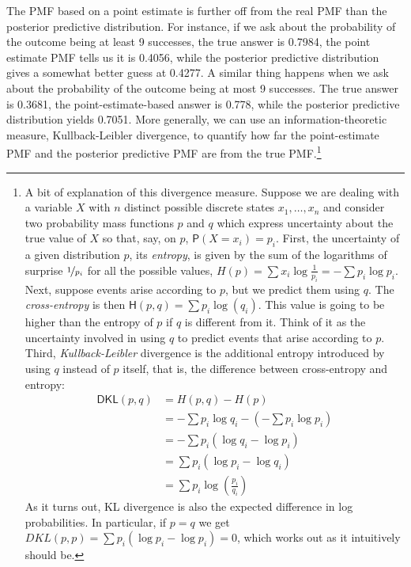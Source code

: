 \documentclass[
  10pt,
  dvipsnames,enabledeprecatedfontcommands]{scrartcl}
\newcommand{\pr}[1]{\mathsf{P}(#1)}
\begin{document}
The PMF based on a point estimate is further off from the real PMF than
the posterior predictive distribution. For instance, if we ask about the
probability of the outcome being at least 9 successes, the true answer
is 0.7984, the point estimate PMF tells us it is 0.4056, while the
posterior predictive distribution gives a somewhat better guess at
0.4277. A similar thing happens when we ask about the probability of the
outcome being at most 9 successes. The true answer is 0.3681, the
point-estimate-based answer is 0.778, while the posterior predictive
distribution yields 0.7051. More generally, we can use an
information-theoretic measure, Kullback-Leibler divergence, to quantify
how far the point-estimate PMF and the posterior predictive PMF are from
the true
PMF.\footnote{A bit of explanation of this divergence measure. Suppose we are dealing with a variable $X$ with $n$ distinct possible discrete states $x_1, \dots, x_n$ and consider two probability mass functions $p$ and $q$ which express uncertainty about the true value of $X$ so that, say, on $p$, $\pr{X=x_i}=p_i$. First, the uncertainty of a given distribution $p$, its \emph{entropy}, is given by the sum of the logarithms of surprise $\nicefrac{1}{p_i}$ for all the possible values,  $H(p) = \sum x_i \log \frac{1}{p_i} = - \sum p_i \log p_i$.  Next, suppose events arise according to $p$, but we predict them
using $q$. The \emph{cross-entropy}  is then  $\mathsf{H}(p, q)  = \sum p_i \log(q_i)$. This value is going to be higher than the entropy of $p$ if $q$ is different from it. Think of it as the uncertainty involved in using $q$ to predict events that arise according to $p$.  Third, \emph{Kullback-Leibler}  divergence is the additional entropy introduced by
using $q$ instead of $p$ itself, that is, the difference between cross-entropy and entropy:
\begin{align*}
\mathsf{DKL}(p, q) & = H(p, q) - H(p)\\
&= - \sum p_i \log q_i   - \left(   - \sum p_i \log p_i \right) \\
& = - \sum p_i\left( \log q_i - \log p_i\right)\\
& =  \sum p_i\left( \log p_i - \log q_i\right)\\
& = \sum p_i \log \left( \frac{p_i}{q_i}\right)
\end{align*} \noindent  As it turns out, KL divergence is also the expected
difference in log probabilities. In particular, if
\(p=q\) we get
\(DKL(p,p) = \sum p_i (\log p_i - \log p_i) = 0\),
which works out as it intuitively should be.}
\end{document}
